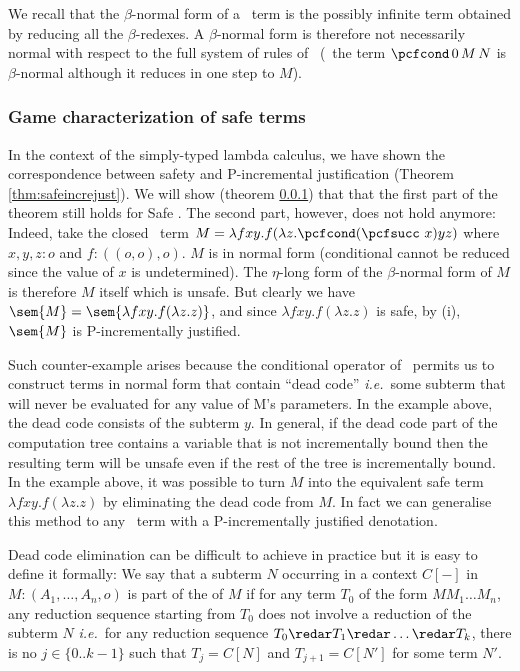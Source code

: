 We recall that the $\beta$-normal form of a \pcf\ term is the possibly infinite term obtained by reducing all the $\beta$-redexes. A $\beta$-normal form is therefore not necessarily normal with respect to the full system of rules of \pcf\ (\eg\ the term $\pcfcond\, 0\, M\, N$ is $\beta$-normal although it reduces in one step to $M$).

\subsubsection{Game characterization of safe terms}

In the context of the simply-typed lambda calculus, we have shown the
correspondence between safety and P-incremental justification (Theorem \ref{thm:safeincrejust}).
We will show (theorem \ref{}) that that the first part of the theorem
still holds for Safe \pcf. The second part, however, does not
hold anymore: Indeed, take the closed \pcf\ term $M = \lambda f x y. f
(\lambda z. \pcfcond (\pcfsucc\ x) y z )$ where $x,y,z:o$ and
$f:((o,o),o)$. $M$ is in normal form (conditional cannot be reduced
since the value of $x$ is undetermined). The $\eta$-long form of the
$\beta$-normal form of $M$ is therefore $M$ itself which is unsafe.
But clearly we have $\sem{M} = \sem{\lambda f x y. f (\lambda z.
z)}$, and since $\lambda f x y. f (\lambda z. z)$ is safe, by (i),
$\sem{M}$ is P-incrementally justified.

Such counter-example arises because the conditional operator of
\pcf\ permits us to construct terms in normal form that contain
``dead code'' {\it i.e.}~some subterm that will never be evaluated
for any value of M's parameters. In the example above, the dead code
consists of the subterm $y$. In general, if the dead code part of
the computation tree contains a variable that is not incrementally
bound then the resulting term will be unsafe even if the rest of the
tree is incrementally bound. In the example above, it was possible
to turn $M$ into the equivalent safe term $\lambda f x y. f (\lambda
z. z)$ by eliminating the dead code from $M$. In fact we can
generalise this method to any \pcf\ term with a P-incrementally
justified denotation.
\smallskip

Dead code elimination can be difficult to achieve in practice but it
is easy to define it formally: We say that a subterm $N$ occurring
in a context $C[-]$ in $M : (A_1, \ldots, A_n,o)$ is part of the
 of $M$ if for any term $T_0$ of the form $M M_1
\ldots M_n$, any reduction sequence starting from $T_0$ does not
involve a reduction of the subterm $N$ {\it i.e.}~for any reduction
sequence $T_0 \redar T_1 \redar \ldots \redar T_k$, there is no
$j\in \{0.. k-1\}$ such that $T_j = C[N]$ and $T_{j+1} = C[N']$ for
some term $N'$.


